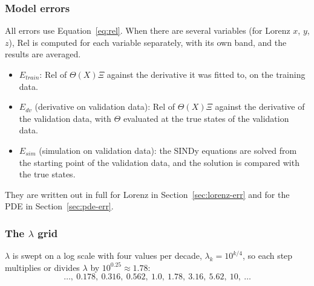 \documentclass[11pt,a4paper]{article}
\begin{document}
\subsubsection{Model errors}
All errors use Equation~\eqref{eq:rel}. When there are several variables (for Lorenz $x$, $y$, $z$), Rel is computed for each variable separately, with its own band, and the results are averaged.
\begin{itemize}
  \item $E_{train}$: Rel of $\Theta(X)\Xi$ against the derivative it was fitted to, on the training data.
  \item $E_{dv}$ (derivative on validation data): Rel of $\Theta(X)\Xi$ against the derivative of the validation data, with $\Theta$ evaluated at the true states of the validation data.
  \item $E_{sim}$ (simulation on validation data): the SINDy equations are solved from the starting point of the validation data, and the solution is compared with the true states.
\end{itemize}
They are written out in full for Lorenz in Section~\ref{sec:lorenz-err} and for the PDE in Section~\ref{sec:pde-err}.

\subsubsection{The $\lambda$ grid}\label{sec:grid}
$\lambda$ is swept on a log scale with four values per decade, $\lambda_k=10^{k/4}$, so each step multiplies or divides $\lambda$ by $10^{0.25}\approx1.78$:
\[
  \dots,\ 0.178,\ 0.316,\ 0.562,\ 1.0,\ 1.78,\ 3.16,\ 5.62,\ 10,\ \dots
\]
\end{document}
